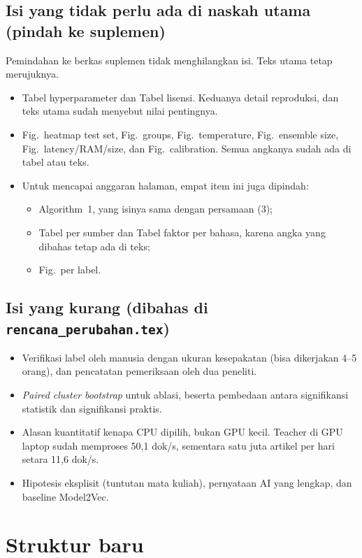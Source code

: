 \documentclass[10pt,a4paper]{article}
\begin{document}
\subsection{Isi yang tidak perlu ada di naskah utama (pindah ke suplemen)}
Pemindahan ke berkas suplemen tidak menghilangkan isi. Teks utama tetap merujuknya.
\begin{itemize}
  \item Tabel hyperparameter dan Tabel lisensi. Keduanya detail reproduksi, dan teks utama sudah menyebut nilai pentingnya.
  \item Fig.~heatmap test set, Fig.~groups, Fig.~temperature, Fig.~ensemble size, Fig.~latency/RAM/size, dan Fig.~calibration. Semua angkanya sudah ada di tabel atau teks.
  \item Untuk mencapai anggaran halaman, empat item ini juga dipindah:
  \begin{itemize}
    \item Algorithm~1, yang isinya sama dengan persamaan (3);
    \item Tabel per sumber dan Tabel faktor per bahasa, karena angka yang dibahas tetap ada di teks;
    \item Fig.~per label.
  \end{itemize}
\end{itemize}

\subsection{Isi yang kurang (dibahas di \texttt{rencana\_perubahan.tex})}
\begin{itemize}
  \item Verifikasi label oleh manusia dengan ukuran kesepakatan (bisa dikerjakan 4--5 orang), dan pencatatan pemeriksaan oleh dua peneliti.
  \item \emph{Paired cluster bootstrap} untuk ablasi, beserta pembedaan antara signifikansi statistik dan signifikansi praktis.
  \item Alasan kuantitatif kenapa CPU dipilih, bukan GPU kecil. Teacher di GPU laptop sudah memproses 50,1 dok/s, sementara satu juta artikel per hari setara 11,6 dok/s.
  \item Hipotesis eksplisit (tuntutan mata kuliah), pernyataan AI yang lengkap, dan baseline Model2Vec.
\end{itemize}

\section{Struktur baru}
\end{document}
